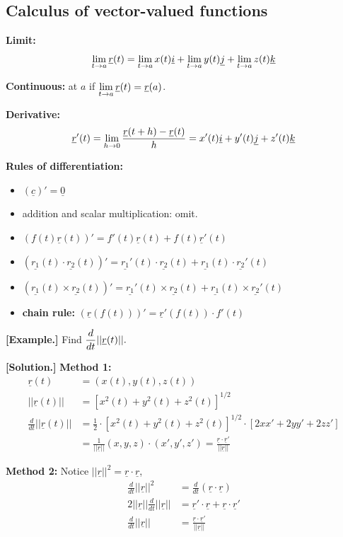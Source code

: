 \documentclass[11pt, a4paper]{MATH2023}
\newcommand{\eg}{\textbf{[Example.] }}
\newcommand{\sol}{\textbf{[Solution.] }}
\newcommand{\vct}{\underline}
\newcommand{\rr}{\underline{r}}
\newcommand{\ii}{\underline{i}}
\newcommand{\kk}{\underline{k}}
\newcommand{\jj}{\underline{j}}
\begin{document}
\begin{spacing}{1.3}
    \section{Calculus of vector-valued functions}

    {\bf Limit:}
    $$\lim_{t\rar a}\rr(t)=\lim_{t\rar a}x(t)\ii+\lim_{t\rar a}y(t)\jj+\lim_{t\rar a}z(t)\kk$$

    {\bf Continuous:} at $a$ if $\disp \lim_{t\rar a}\rr(t)=\rr(a)$.

    {\bf Derivative: } 
    $$\rr'(t)=\lim_{h\rar 0}\frac{\rr(t+h)-\rr(t)}{h}=x'(t)\ii+y'(t)\jj+z'(t)\kk$$

    {\bf Rules of differentiation:}
    \begin{itemize}
        \item $(\vct{c})'=\vct{0}$
        \item addition and scalar multiplication: omit.
        \item $(f(t)\rr(t))'=f'(t)\rr(t)+f(t)\rr'(t)$
        \item $(\vct{r_1}(t)\cdot \vct{r_2}(t))'=\vct{r_1}'(t)\cdot \vct{r_2}(t)
        +\vct{r_1}(t)\cdot \vct{r_2}'(t)$
        \item $(\vct{r_1}(t)\times \vct{r_2}(t))'=\vct{r_1}'(t)\times \vct{r_2}(t)
        +\vct{r_1}(t)\times \vct{r_2}'(t)$
        \item {\bf chain rule:} $(\rr(f(t)))'=\rr'(f(t))\cdot f'(t)$
    \end{itemize}

    \eg Find $\disp \frac{d}{dt}||\rr(t)||.$

    \sol {\bf Method 1:}
    \begin{align*}
        \rr(t) &= (x(t), y(t), z(t))\\
        ||\rr(t)|| &= [x^2(t)+y^2(t)+z^2(t)]^{1/2}\\
        \frac{d}{dt}||\rr(t)|| &= \frac{1}{2}\cdot [x^2(t)+y^2(t)+z^2(t)]^{1/2}
        \cdot [2xx'+2yy'+2zz']\\
        &= \frac{1}{||\rr||}(x,y,z)\cdot (x',y',z')=\frac{\rr\cdot \rr'}{||\rr||}
    \end{align*}

    {\bf Method 2:} Notice $||\rr||^2=\rr\cdot \rr$,
    \begin{align*}
        \frac{d}{dt}||\rr||^2 &= \frac{d}{dt}(\rr\cdot \rr)\\
        2||\rr||\frac{d}{dt}||\rr|| &= \rr'\cdot \rr+\rr\cdot \rr'\\
        \frac{d}{dt}||\rr|| &= \frac{\rr\cdot \rr'}{||\rr||}
    \end{align*}


\end{spacing}
\end{document}
